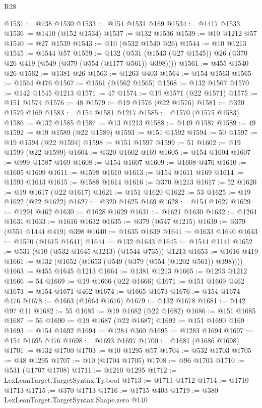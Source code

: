 \begin{lexlean}{R28}
\begin{coremodule}
@1531 := @738 @1530
@1533 := @154 @1531 @169
@1534 := @1417 @1533
@1536 := @1410 (@152 @1534)
@1537 := @132 @1536
@1539 := @10 @1212 @57
@1540 := @27 @1539
@1543 := @10 (@532 @1540 @26)
@1544 := @10 @1213
@1545 := @1544 @57
@1559 := @132 (@531 (@1543 (@27 @1545)) @26 (@370 @26 @419 (@549 (@379 (@554 (@1177 @561)) @398))))
@1561 := @455 @1540 @26
@1562 := @1381 @26
@1563 := @1263 @403
@1564 := @154 @1563
@1565 := @1564 @476
@1567 := @1561 (@1562 @1565)
@1568 := @132 @1567
@1570 := @142 @1545 @1213
@1571 := 47
@1574 := @19 @1571 (@22 @1571)
@1575 := @151 @1574
@1576 := 48
@1579 := @19 @1576 (@22 @1576)
@1581 := @320 @1579 @169
@1583 := @154 @1581 @1217
@1585 := @1570 (@1575 @1583)
@1586 := @132 @1585
@1587 := @13 @1213
@1588 := @149 @1587
@1589 := 49
@1592 := @19 @1589 (@22 @1589)
@1593 := @151 @1592
@1594 := 50
@1597 := @19 @1594 (@22 @1594)
@1598 := @151 @1597
@1599 := 51
@1602 := @19 @1599 (@22 @1599)
@1604 := @320 @1602 @169
@1605 := @154 @1604
@1607 := @999 @1587 @169
@1608 := @154 @1607
@1609 := @1608 @476
@1610 := @1605 @1609
@1611 := @1598 @1610
@1613 := @154 @1611 @169
@1614 := @1593 @1613
@1615 := @1588 @1614
@1616 := @370 @1213
@1617 := 52
@1620 := @19 @1617 (@22 @1617)
@1621 := @151 @1620
@1622 := 53
@1625 := @19 @1622 (@22 @1622)
@1627 := @320 @1625 @169
@1628 := @154 @1627
@1629 := @1291 @462
@1630 := @1628 @1629
@1631 := @1621 @1630
@1632 := @1264 @1631
@1633 := @1616 @1632
@1635 := @379 (@547 @1215)
@1639 := @379 (@551 @1444 @419) @398
@1640 := @1635 @1639
@1641 := @1633 @1640
@1643 := @1570 (@1615 @1641)
@1644 := @132 @1643
@1645 := @1544 @1141
@1652 := @531 (@10 (@532 @1645 @1213) (@1544 @735)) @1213
@1653 := @1616 @419
@1661 := @132 (@1652 (@1653 (@549 (@379 (@554 (@1202 @561)) @398))))
@1663 := @455 @1645 @1213
@1664 := @1381 @1213
@1665 := @1293 @1212
@1666 := 54
@1669 := @19 @1666 (@22 @1666)
@1671 := @151 @1669 @462
@1673 := @154 @1671 @462
@1674 := @1665 @1673
@1676 := @154 @1674 @476
@1678 := @1663 (@1664 @1676)
@1679 := @132 @1678
@1681 := @142 @97 @11
@1682 := 55
@1685 := @19 @1682 (@22 @1682)
@1686 := @151 @1685
@1687 := 56
@1690 := @19 @1687 (@22 @1687)
@1692 := @151 @1690 @169
@1693 := @154 @1692
@1694 := @1284 @360
@1695 := @1283 @1694
@1697 := @154 @1695 @476
@1698 := @1693 @1697
@1700 := @1681 (@1686 @1698)
@1701 := @132 @1700
@1703 := @10 @1295 @57
@1704 := @532 @1703
@1705 := @48 @1295
@1707 := @10 (@1704 @1705)
@1708 := @96 @1703
@1710 := @531 (@1707 @1708)
@1711 := @1210 @1295
@1712 := LexLeanTarget.TargetSyntax.Ty.bool
@1713 := @1711 @1712
@1714 := @1710 @1713
@1715 := @370 @1713
@1716 := @1715 @403
@1719 := @380 LexLeanTarget.TargetSyntax.Shape.zero @140

\end{coremodule}
\end{lexlean}
